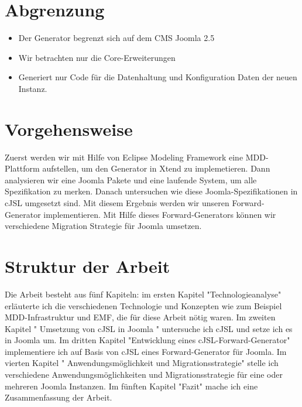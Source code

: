 \section{Abgrenzung}
\begin{itemize}
\item Der Generator begrenzt sich auf dem CMS Joomla 2.5
\item Wir betrachten nur die Core-Erweiterungen
\item Generiert nur Code für die Datenhaltung und Konfiguration Daten der neuen Instanz.
\end{itemize}

\section{Vorgehensweise}
Zuerst werden wir mit Hilfe von Eclipse Modeling Framework eine MDD-Plattform aufstellen, um den Generator in Xtend zu implemetieren. Dann analysieren  wir eine Joomla Pakete und eine laufende System, um alle Spezifikation zu merken. Danach untersuchen wie diese Joomla-Spezifikationen in cJSL umgesetzt sind. Mit diesem Ergebnis werden wir unseren Forward-Generator implementieren. Mit Hilfe dieses Forward-Generators können wir verschiedene Migration Strategie für Joomla umsetzen.

\section{Struktur der Arbeit}

Die Arbeit besteht aus fünf Kapiteln: im ersten Kapitel "Technologieanalyse" erläuterte  ich  die verschiedenen Technologie und Konzepten wie zum Beispiel MDD-Infrastruktur und EMF, die für diese Arbeit nötig waren. Im zweiten Kapitel " Umsetzung von cJSL in Joomla " untersuche ich  cJSL und setze ich es in Joomla um. Im dritten Kapitel "Entwicklung eines cJSL-Forward-Generator" implementiere ich  auf Basis von cJSL eines Forward-Generator für Joomla. Im vierten Kapitel " Anwendungsmöglichkeit und Migrationsstrategie" stelle ich  verschiedene Anwendungsmöglichkeiten und Migrationsstrategie für eine oder mehreren Joomla Instanzen. Im fünften Kapitel "Fazit" mache ich eine Zusammenfassung der Arbeit.

